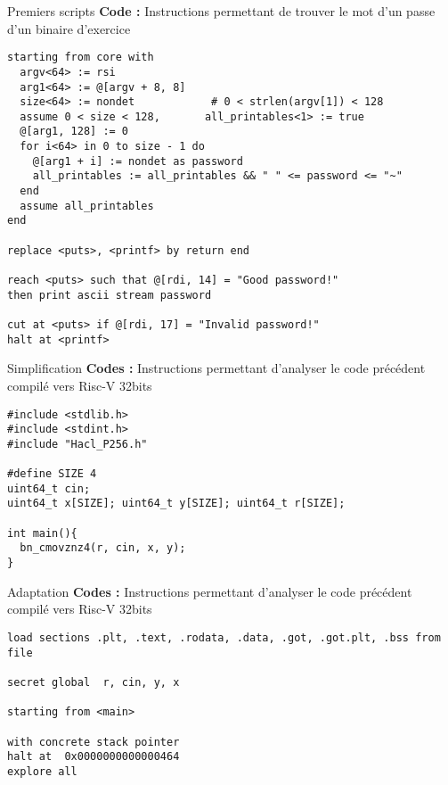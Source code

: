 \documentclass{backend/backend}
\begin{document}
{\begin{frame}[fragile]{Premiers scripts}
    \textbf{Code :} Instructions permettant de trouver le mot d'un passe d'un binaire d'exercice
    \begin{verbatim}
starting from core with
  argv<64> := rsi
  arg1<64> := @[argv + 8, 8]
  size<64> := nondet            # 0 < strlen(argv[1]) < 128
  assume 0 < size < 128,       all_printables<1> := true
  @[arg1, 128] := 0
  for i<64> in 0 to size - 1 do
    @[arg1 + i] := nondet as password
    all_printables := all_printables && " " <= password <= "~"
  end
  assume all_printables
end

replace <puts>, <printf> by return end

reach <puts> such that @[rdi, 14] = "Good password!"
then print ascii stream password

cut at <puts> if @[rdi, 17] = "Invalid password!"
halt at <printf>
\end{verbatim}


\end{frame}

\begin{frame}[fragile]{Simplification}
\textbf{Codes :} Instructions permettant d'analyser le code précédent compilé vers Risc-V 32bits
    
\begin{verbatim}
#include <stdlib.h>
#include <stdint.h>
#include "Hacl_P256.h"

#define SIZE 4
uint64_t cin;
uint64_t x[SIZE]; uint64_t y[SIZE]; uint64_t r[SIZE];

int main(){
  bn_cmovznz4(r, cin, x, y);
}
\end{verbatim}
\end{frame}

\begin{frame}[fragile]{Adaptation}
    \textbf{Codes :} Instructions permettant d'analyser le code précédent compilé vers Risc-V 32bits
    
    \begin{verbatim}
load sections .plt, .text, .rodata, .data, .got, .got.plt, .bss from file

secret global  r, cin, y, x

starting from <main>

with concrete stack pointer
halt at  0x0000000000000464
explore all

\end{verbatim}
\end{frame}

}
\end{document}
